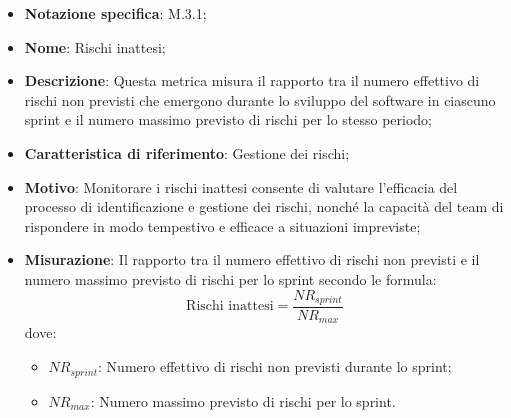\begin{itemize}
    \item \textbf{Notazione specifica}: M.3.1;
    \item \textbf{Nome}: Rischi inattesi;
    \item \textbf{Descrizione}: Questa metrica misura il rapporto tra il numero effettivo di rischi non previsti che emergono durante lo sviluppo del software in ciascuno sprint e il numero massimo previsto di rischi per lo stesso periodo;
    \item \textbf{Caratteristica di riferimento}: Gestione dei rischi;
    \item \textbf{Motivo}: Monitorare i rischi inattesi consente di valutare l'efficacia del processo di identificazione e gestione dei rischi, nonché la capacità del team di rispondere in modo tempestivo e efficace a situazioni impreviste;
    \item \textbf{Misurazione}: Il rapporto tra il numero effettivo di rischi non previsti e il numero massimo previsto di rischi per lo sprint secondo le formula:
    \[
        \text{Rischi inattesi} =\frac{NR_{sprint}}{NR_{max}} 
    \]
    dove:
    \begin{itemize}
        \item $NR_{sprint}$: Numero effettivo di rischi non previsti durante lo sprint;
        \item $NR_{max}$: Numero massimo previsto di rischi per lo sprint.
    \end{itemize}
\end{itemize}
